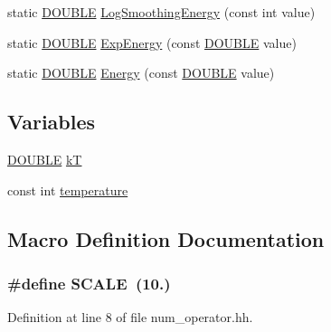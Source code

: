 \begin{DoxyCompactItemize}
\item 
static \hyperlink{energy__const_8hh_a8747af38b86aa2bbcda2f1b1aa0888c2}{D\+O\+U\+B\+L\+E} \hyperlink{num__operator_8hh_a7ab48a3f89b2fa34ecd4c109ebc6d5bf}{Log\+Smoothing\+Energy} (const int value)
\item 
static \hyperlink{energy__const_8hh_a8747af38b86aa2bbcda2f1b1aa0888c2}{D\+O\+U\+B\+L\+E} \hyperlink{num__operator_8hh_ac8c038b1048e530defe0fb3cd897f900}{Exp\+Energy} (const \hyperlink{energy__const_8hh_a8747af38b86aa2bbcda2f1b1aa0888c2}{D\+O\+U\+B\+L\+E} value)
\item 
static \hyperlink{energy__const_8hh_a8747af38b86aa2bbcda2f1b1aa0888c2}{D\+O\+U\+B\+L\+E} \hyperlink{num__operator_8hh_a5aff2cb259eecce13bcf55ef672f9a6c}{Energy} (const \hyperlink{energy__const_8hh_a8747af38b86aa2bbcda2f1b1aa0888c2}{D\+O\+U\+B\+L\+E} value)
\end{DoxyCompactItemize}
\subsection*{Variables}
\begin{DoxyCompactItemize}
\item 
\hyperlink{energy__const_8hh_a8747af38b86aa2bbcda2f1b1aa0888c2}{D\+O\+U\+B\+L\+E} \hyperlink{num__operator_8hh_ad41fe83f95add9cc649f41be659389cb}{k\+T}
\item 
const int \hyperlink{num__operator_8hh_a9bb68aa6c4819d6d9361d10f2d5829ae}{temperature}
\end{DoxyCompactItemize}


\subsection{Macro Definition Documentation}
\hypertarget{num__operator_8hh_a0cbea62f1ce2043dd08108e65ed8de1d}{
\subsubsection[{S\+C\+A\+L\+E}]{\setlength{\rightskip}{0pt plus 5cm}\#define S\+C\+A\+L\+E~(10.)}}\label{num__operator_8hh_a0cbea62f1ce2043dd08108e65ed8de1d}


Definition at line 8 of file num\+\_\+operator.\+hh.

